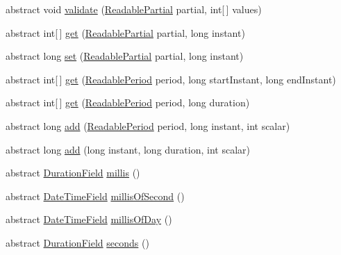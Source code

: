 \begin{DoxyCompactItemize}
\item 
abstract void \hyperlink{classorg_1_1joda_1_1time_1_1_chronology_aeab0b1122839348b5f93a5b5cf85be12}{validate} (\hyperlink{interfaceorg_1_1joda_1_1time_1_1_readable_partial}{Readable\-Partial} partial, int\mbox{[}$\,$\mbox{]} values)
\item 
abstract int\mbox{[}$\,$\mbox{]} \hyperlink{classorg_1_1joda_1_1time_1_1_chronology_a5611d9cc072d133a645aec6cee0f9287}{get} (\hyperlink{interfaceorg_1_1joda_1_1time_1_1_readable_partial}{Readable\-Partial} partial, long instant)
\item 
abstract long \hyperlink{classorg_1_1joda_1_1time_1_1_chronology_a34ae21380f16a7ab057fb14ee878c6ef}{set} (\hyperlink{interfaceorg_1_1joda_1_1time_1_1_readable_partial}{Readable\-Partial} partial, long instant)
\item 
abstract int\mbox{[}$\,$\mbox{]} \hyperlink{classorg_1_1joda_1_1time_1_1_chronology_a9453e94164d18e5990b5ea7f6c3261b6}{get} (\hyperlink{interfaceorg_1_1joda_1_1time_1_1_readable_period}{Readable\-Period} period, long start\-Instant, long end\-Instant)
\item 
abstract int\mbox{[}$\,$\mbox{]} \hyperlink{classorg_1_1joda_1_1time_1_1_chronology_a7e8f838e80d9a7f72d67298f70aa7ff5}{get} (\hyperlink{interfaceorg_1_1joda_1_1time_1_1_readable_period}{Readable\-Period} period, long duration)
\item 
abstract long \hyperlink{classorg_1_1joda_1_1time_1_1_chronology_a1d92a9005d51c9a5d84221c12fa48dd5}{add} (\hyperlink{interfaceorg_1_1joda_1_1time_1_1_readable_period}{Readable\-Period} period, long instant, int scalar)
\item 
abstract long \hyperlink{classorg_1_1joda_1_1time_1_1_chronology_a1ffc5f05410a98fed58bbbc2ad78a8d3}{add} (long instant, long duration, int scalar)
\item 
abstract \hyperlink{classorg_1_1joda_1_1time_1_1_duration_field}{Duration\-Field} \hyperlink{classorg_1_1joda_1_1time_1_1_chronology_a7e7fd35515d1a550eda5ffae865afad1}{millis} ()
\item 
abstract \hyperlink{classorg_1_1joda_1_1time_1_1_date_time_field}{Date\-Time\-Field} \hyperlink{classorg_1_1joda_1_1time_1_1_chronology_ae327f2dac4d8175238ebfac9b0bb5f57}{millis\-Of\-Second} ()
\item 
abstract \hyperlink{classorg_1_1joda_1_1time_1_1_date_time_field}{Date\-Time\-Field} \hyperlink{classorg_1_1joda_1_1time_1_1_chronology_aeb9fee45c40ba6e09ca507f630ec3417}{millis\-Of\-Day} ()
\item 
abstract \hyperlink{classorg_1_1joda_1_1time_1_1_duration_field}{Duration\-Field} \hyperlink{classorg_1_1joda_1_1time_1_1_chronology_a770a5869c4168c46f43f5b04c7ae1660}{seconds} ()

\end{DoxyCompactItemize}
